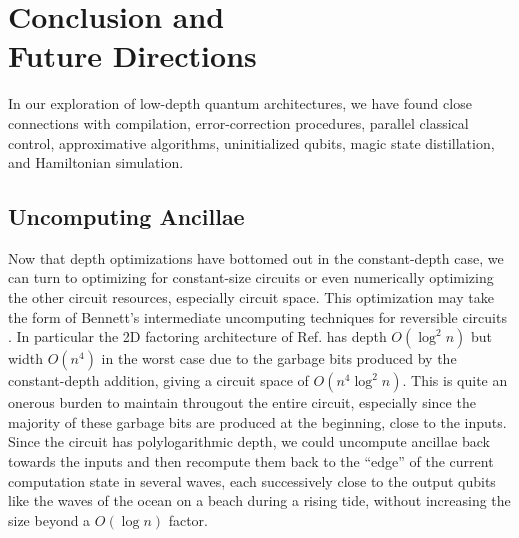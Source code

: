 \section{Conclusion and \\ Future Directions}
\label{sec:conclude}

In our exploration of low-depth quantum architectures, we have found
close connections with compilation,
error-correction procedures, parallel classical
control, approximative algorithms, uninitialized qubits, magic state
distillation, and Hamiltonian simulation.

\subsection{Uncomputing Ancillae}

Now that depth optimizations have bottomed out in the constant-depth case,
we can turn to optimizing for constant-size circuits or even numerically
optimizing the other circuit resources, especially circuit space.
This optimization may take the form of Bennett's intermediate uncomputing
techniques for reversible circuits \cite{Bennett1973}.
In
particular the 2D factoring architecture of Ref. \cite{Pham2012b} has
depth $O(\log^2 n)$ but width $O(n^4)$ in the worst case due to the garbage
bits produced by the constant-depth addition, giving a circuit space of
$O(n^4 \log^2 n)$. This is quite an onerous burden
to maintain througout the entire circuit, especially since the majority of
these garbage bits are produced at the beginning, close to the inputs.
Since the circuit has polylogarithmic depth, we could uncompute ancillae back
towards the inputs and then recompute them back to the ``edge'' of the current computation
state in several waves, each successively close to the output qubits
like the waves of the ocean on a beach during a rising tide, without increasing
the size beyond a $O(\log n)$ factor.

